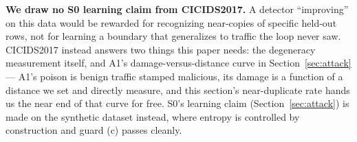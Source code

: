 \textbf{We draw no S0 learning claim from CICIDS2017.} A detector “improving” on this data
would be rewarded for recognizing near-copies of specific held-out rows, not for learning a
boundary that generalizes to traffic the loop never saw. CICIDS2017 instead answers two things
this paper needs: the degeneracy measurement itself, and A1's damage-versus-distance curve in
Section~\ref{sec:attack} — A1's poison is benign traffic stamped malicious, its damage is a
function of a distance we set and directly measure, and this section's near-duplicate rate
hands us the near end of that curve for free. S0's learning claim (Section~\ref{sec:attack}) is
made on the synthetic dataset instead, where entropy is controlled by construction and guard (c)
passes cleanly.
